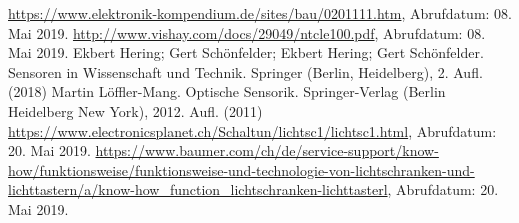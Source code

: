 \begin{thebibliography}{99}
 \url{https://www.elektronik-kompendium.de/sites/bau/0201111.htm}, Abrufdatum: 08. Mai 2019.
 \url{http://www.vishay.com/docs/29049/ntcle100.pdf}, Abrufdatum: 08. Mai 2019.
 Ekbert Hering; Gert Schönfelder; Ekbert Hering; Gert Schönfelder. Sensoren in Wissenschaft und Technik. Springer (Berlin, Heidelberg), 2. Aufl. (2018)
 Martin Löffler-Mang. Optische Sensorik. Springer-Verlag (Berlin Heidelberg New York), 2012. Aufl. (2011)
 \url{https://www.electronicsplanet.ch/Schaltun/lichtsc1/lichtsc1.html}, Abrufdatum: 20. Mai 2019.
 \url{https://www.baumer.com/ch/de/service-support/know-how/funktionsweise/funktionsweise-und-technologie-von-lichtschranken-und-lichttastern/a/know-how_function_lichtschranken-lichttasterl}, Abrufdatum: 20. Mai 2019.


\end{thebibliography}